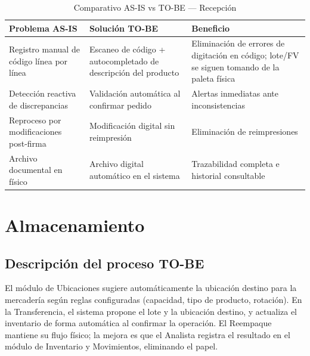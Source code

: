 \documentclass[11pt, a4paper, oneside]{report}
\begin{document}
\begin{table}[H]
\centering\small
\renewcommand{\arraystretch}{1.3}
\setlength{\tabcolsep}{4pt}
\begin{tabularx}{\textwidth}{|>{\raggedright\arraybackslash}p{}|>{\raggedright\arraybackslash}p{}|>{\raggedright\arraybackslash}X|}
\hline
\rowcolor{upeu_dark}
\color{white}\bfseries Problema AS-IS & \color{white}\bfseries Solución TO-BE & \color{white}\bfseries Beneficio \\ \hline
\rowcolor{gray!10}
Registro manual de código línea por línea & Escaneo de código + autocompletado de descripción del producto & Eliminación de errores de digitación en código; lote/FV se siguen tomando de la paleta física \\ \hline
Detección reactiva de discrepancias & Validación automática al confirmar pedido & Alertas inmediatas ante inconsistencias \\ \hline
\rowcolor{gray!10}
Reproceso por modificaciones post-firma & Modificación digital sin reimpresión & Eliminación de reimpresiones \\ \hline
Archivo documental en físico & Archivo digital automático en el sistema & Trazabilidad completa e historial consultable \\ \hline
\end{tabularx}
\caption{Comparativo AS-IS vs TO-BE --- Recepción}
\end{table}

\section{Almacenamiento}

\subsection{Descripción del proceso TO-BE}

El módulo de Ubicaciones sugiere automáticamente la ubicación destino para la mercadería según reglas configuradas (capacidad, tipo de producto, rotación). En la Transferencia, el sistema propone el lote y la ubicación destino, y actualiza el inventario de forma automática al confirmar la operación. El Reempaque mantiene su flujo físico; la mejora es que el Analista registra el resultado en el módulo de Inventario y Movimientos, eliminando el papel.
\end{document}
